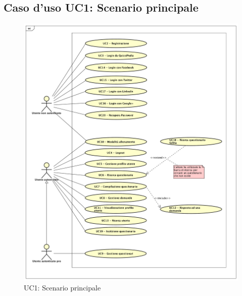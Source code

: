 \newpage
\subsection{Caso d'uso UC1: Scenario principale}

\label{UC1}
\begin{figure}[ht]
	\centering
	\includegraphics[scale=0.45]{UML/UC1.png}
	\caption{UC1: Scenario principale}
\end{figure}
\FloatBarrier
